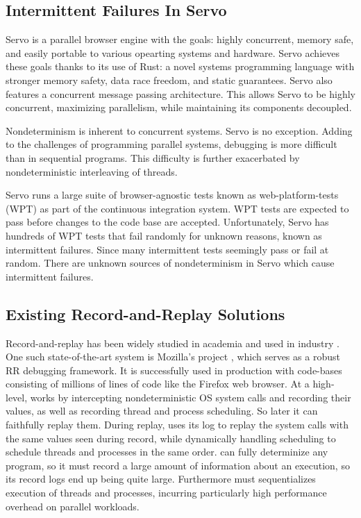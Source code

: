 \subsection{Intermittent Failures In Servo}
Servo \citep{servo} is a parallel browser engine with the goals: highly concurrent,
memory safe, and easily portable to various opearting systems and hardware. Servo achieves these goals thanks to its use of Rust: a novel systems programming language with stronger memory safety,
data race freedom, and static guarantees. Servo also features a concurrent message passing architecture. This allows Servo to be highly concurrent, maximizing parallelism,
while maintaining its components decoupled.

Nondeterminism is inherent to concurrent systems. Servo is no exception. Adding to
the challenges of programming parallel systems, debugging is more difficult than in
sequential programs. This difficulty is further exacerbated by nondeterministic
interleaving of threads.

Servo runs a large suite of browser-agnostic tests known as web-platform-tests (WPT) \cite{wpt}
as part of the continuous integration system. WPT tests are expected to pass before
changes to the code base are accepted. Unfortunately, Servo has hundreds of WPT tests that
fail randomly for unknown reasons, known as intermittent failures. Since many intermittent
tests seemingly pass or fail at random. There are unknown sources of nondeterminism in
Servo which cause intermittent failures.

\subsection{Existing Record-and-Replay Solutions}
Record-and-replay has been widely studied in academia \cite{arnold, r2, panda, review-reverse-debugging, hunt_ddos:_2013, castor, jockey} and used in industry \cite{retrace}. One
such state-of-the-art system is Mozilla's  project \citep{mozilla-rr}, which serves
as a robust RR debugging framework. It is successfully used in production
with code-bases consisting of millions of lines of code like the Firefox web browser.
At a high-level,  works by intercepting nondeterministic OS system calls and recording
their values, as well as recording thread and process scheduling. So later it can faithfully
replay them. During replay,  uses its log to replay the system calls with the same
values seen during record, while dynamically handling scheduling to schedule threads
and processes in the same order.  can fully determinize any program,
so it must record a large amount of information about an execution, so its record logs
end up being quite large. Furthermore  must sequentializes execution of threads and
processes, incurring particularly high performance overhead on parallel workloads.


